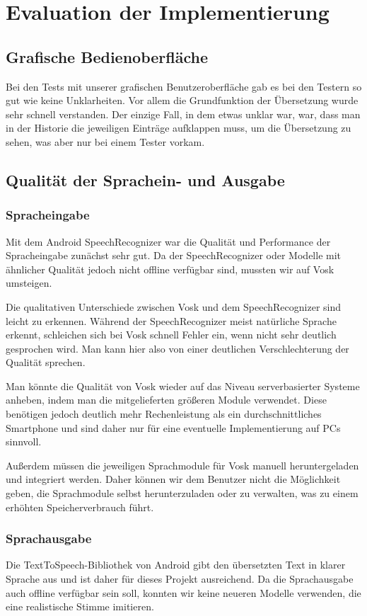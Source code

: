 \newpage
\section{Evaluation der Implementierung}\label{sec:evaluation}

\subsection{Grafische Bedienoberfläche}
Bei den Tests mit unserer grafischen Benutzeroberfläche gab es bei den Testern so gut wie keine Unklarheiten. Vor allem die Grundfunktion der Übersetzung wurde sehr schnell verstanden. Der einzige Fall, in dem etwas unklar war, war, dass man in der Historie die jeweiligen Einträge aufklappen muss, um die Übersetzung zu sehen, was aber nur bei einem Tester vorkam. 

\subsection{Qualität der Sprachein- und Ausgabe}
\subsubsection{Spracheingabe}
Mit dem Android SpeechRecognizer war die Qualität und Performance der Spracheingabe zunächst sehr gut. Da der SpeechRecognizer oder Modelle mit ähnlicher Qualität jedoch nicht offline verfügbar sind, mussten wir auf Vosk umsteigen. 

Die qualitativen Unterschiede zwischen Vosk und dem SpeechRecognizer sind leicht zu erkennen. Während der SpeechRecognizer meist natürliche Sprache erkennt, schleichen sich bei Vosk schnell Fehler ein, wenn nicht sehr deutlich gesprochen wird. Man kann hier also von einer deutlichen Verschlechterung der Qualität sprechen.

Man könnte die Qualität von Vosk wieder auf das Niveau serverbasierter Systeme anheben, indem man die mitgelieferten größeren Module verwendet. Diese benötigen jedoch deutlich mehr Rechenleistung als ein durchschnittliches Smartphone und sind daher nur für eine eventuelle Implementierung auf PCs sinnvoll.

Außerdem müssen die jeweiligen Sprachmodule für Vosk manuell heruntergeladen und integriert werden. Daher können wir dem Benutzer nicht die Möglichkeit geben, die Sprachmodule selbst herunterzuladen oder zu verwalten, was zu einem erhöhten Speicherverbrauch führt.

\subsubsection{Sprachausgabe}
Die TextToSpeech-Bibliothek von Android gibt den übersetzten Text in klarer Sprache aus und ist daher für dieses Projekt ausreichend. Da die Sprachausgabe auch offline verfügbar sein soll, konnten wir keine neueren Modelle verwenden, die eine realistische Stimme imitieren.